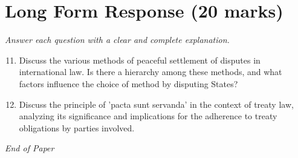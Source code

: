 \documentclass[12pt]{article}
\begin{document}
\section*{Long Form Response (20 marks)}
\textit{Answer each question with a clear and complete explanation.}
\begin{enumerate}[label=\arabic*.]
\setcounter{enumi}{10}
\item Discuss the various methods of peaceful settlement of disputes in international law. Is there a hierarchy among these methods, and what factors influence the choice of method by disputing States?
\item Discuss the principle of 'pacta sunt servanda' in the context of treaty law, analyzing its significance and implications for the adherence to treaty obligations by parties involved.
\end{enumerate}

\vfill
\noindent\textit{End of Paper}
\end{document}
